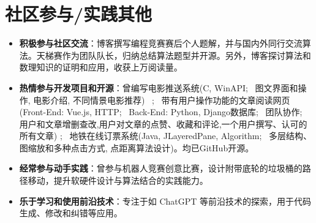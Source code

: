 \documentclass{resume}
\begin{document}


\section{社区参与/实践其他}
\begin{itemize}[parsep=0.2ex]
  \item \textbf{积极参与社区交流}：博客撰写编程竞赛赛后个人题解，并与国内外同行交流算法。天梯赛作为团队队长，归纳总结算法题型并开源。另外，博客探讨算法和数理知识的证明和应用，收获上万阅读量。
  \item \textbf{热情参与开发项目和开源}：曾编写电影推送系统(C, WinAPI; \, 图文界面和操作, 电影介绍, 不同情景电影推荐) \, ; \, 带有用户操作功能的文章阅读网页(Front-End: Vue.js, HTTP; \, Back-End: Python, Django数据库; \, 团队协作; \, 用户和文章增删查改,用户对文章的点赞、收藏和评论,一个用户撰写、认可的所有文章) ; \, 地铁在线订票系统(Java, JLayeredPane, Algorithm; \, 多层结构、图缩放和多种点击方式, 点距离算法设计)。均已GitHub开源。  
  \item \textbf{经常参与动手实践}：曾参与机器人竞赛创意比赛，设计附带底轮的垃圾桶的路径移动，提升软硬件设计与算法结合的实践能力。
  \item \textbf{乐于学习和使用前沿技术}：专注于如 ChatGPT 等前沿技术的探索，用于代码生成、修改和纠错等应用。
\end{itemize}

%
%
\end{document}
